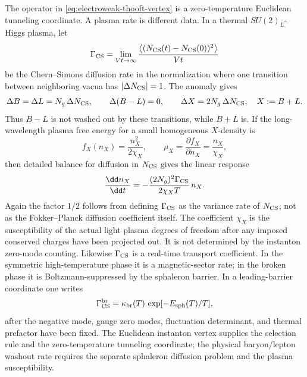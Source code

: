 \begin{controlledapproximation}
\label{ca:electroweak-sphaleron-bplusl-response}
The operator in \eqref{eq:electroweak-thooft-vertex} is a zero-temperature
Euclidean tunneling coordinate.  A plasma rate is different data.  In a
thermal \(SU(2)_L\)-Higgs plasma, let
\[
  \Gamma_{\rm CS}
  =
  \lim_{Vt\to\infty}
  \frac{\left\langle
  (N_{\rm CS}(t)-N_{\rm CS}(0))^2\right\rangle}{Vt}
\]
be the Chern--Simons diffusion rate in the normalization where one transition
between neighboring vacua has \(|\Delta N_{\rm CS}|=1\).  The anomaly gives
\begin{equation}
  \Delta B=\Delta L=N_g\,\Delta N_{\rm CS},
  \qquad
  \Delta(B-L)=0,
  \qquad
  \Delta X=2N_g\,\Delta N_{\rm CS},
  \quad X:=B+L .
  \label{eq:electroweak-bplusl-cs-charge-ledger}
\end{equation}
Thus \(B-L\) is not washed out by these transitions, while \(B+L\) is.  If the
long-wavelength plasma free energy for a small homogeneous \(X\)-density is
\[
  f_X(n_X)=\frac{n_X^2}{2\chi_X},
  \qquad
  \mu_X=\frac{\partial f_X}{\partial n_X}=\frac{n_X}{\chi_X},
\]
then detailed balance for diffusion in \(N_{\rm CS}\) gives the linear response
\begin{equation}
  \frac{\dd n_X}{\dd t}
  =
  -
  \frac{(2N_g)^2\Gamma_{\rm CS}}{2\chi_X T}\,n_X .
  \label{eq:electroweak-sphaleron-bplusl-relaxation}
\end{equation}
Again the factor \(1/2\) follows from defining \(\Gamma_{\rm CS}\) as the
variance rate of \(N_{\rm CS}\), not as the Fokker--Planck diffusion
coefficient itself.
The coefficient \(\chi_X\) is the susceptibility of the actual light plasma
degrees of freedom after any imposed conserved charges have been projected out.
It is not determined by the instanton zero-mode counting.  Likewise
\(\Gamma_{\rm CS}\) is a real-time transport coefficient.  In the symmetric
high-temperature phase it is a magnetic-sector rate; in the broken phase it is
Boltzmann-suppressed by the sphaleron barrier.  In a leading-barrier
coordinate one writes
\[
  \Gamma_{\rm CS}^{\rm br}
  =
  \kappa_{\rm br}(T)\,\exp[-E_{\rm sph}(T)/T],
\]
after the negative mode, gauge zero modes, fluctuation determinant, and thermal
prefactor have been fixed.  The Euclidean instanton vertex supplies the
selection rule and the zero-temperature tunneling coordinate; the physical
baryon/lepton washout rate requires the separate sphaleron diffusion problem
and the plasma susceptibility.
\end{controlledapproximation}

